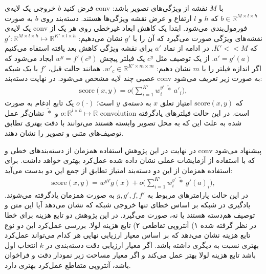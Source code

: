 فرض کنید $b$ خروجی یک لایه‌ی \gls{conv} با $M$ نقشه از ویژگی‌های تصویر باشد: $b \in \mathbb{R}^{M\times l \times h}$ که $h$ و $l$ ارتفاع و عرض نقشه ویژگی‌ها هستند. دسته‌بند روی $b$ به صورت یک لایه‌ی \gls{conv} فورمول‌بندی می‌شود. ابتدا یک کاهش ابعاد غیرخطی روی هر یک از نقشه‌های ویژگی صورت می‌گیرد که آن را با $g'$ نشان می‌دهیم:
$g': \mathbb{R}^{M\times l\times h} \mapsto \mathbb{R}^{K'\times l\times h}$
که
$K' << M$.
در ادامه از نماد  $a'$ برای نقشه ویژگی کاهش بعد یافته استفاه می‌کنیم
$a' = g'(a)$.
از یک توصیف مثل $c^y$ یک  فیلتر پیچش 
 $w^y = f'(c^y)$ ایجاد می‌شود که اگر اندازه فیلتر را با $m$ نشان دهیم: $w'_c \in \mathbb{R}^{K' \times m \times m}$. همانند حالت قبل، $f'$ با یک شبکه عصبی چند لایه مشخص می‌شود. در نهایت دسته‌بند \gls{conv} به صورت زیر تعریف می‌شود:
\begin{align}
\label{eq:conv}
\text{score}(x,y)=o\bigg(\sum_{i=1}^{K'}w^{y'}_{i}\  \check{*} \  a'_i\bigg),
\end{align}
که
 $\text{score}(x,y)$
  امتیاز تعلق $x$ به دسته‌ی $y$ است؛ $o(\cdot)$ یک تابع ادغام به صورت $o:\mathbb{R}^{l\times h} \mapsto \mathbb{R}$  و $\check{*}$ نشان‌گر عمل \gls{convolution} است. در این حالت فیلترهای یادگرفته شده به علت این که به محل تصویر وابسته هستند می‌توانند با دقت بهتری تطابق توصیف‌های متنی و تصویر را نشان دهند.

  در نهایت در این پژوهش استفاده همزمان از دسته‌بندهای خطی و \gls{conv} پیشنهاد می‌شود که با استفاده از آزمایشات عملی نشان داده شده عمل‌کرد بهتری خواهد داشت. برای استفاده همزمان از این دو دسته‌بند امتیاز تطابق از جمع این دو بدست می‌آید:
\begin{align}
\text{score}(x,y)=w^{yT}g(x) + o\bigg(\sum_{i=1}^{K'}w^{y'}_{i}\  \check{*} \  g'(a)_i\bigg),
\end{align}
 در این حالت پارامترهای مربوط به $g, g', f , f'$ به صورت همزمان یادگرفته می‌شوند.
یادگیری در شبکه بر اساس خطای تنها خروجی شبکه که نشان می‌دهد آیا این متن و توصیف هم‌دسته هستند یا نه، صورت می‌گیرد. در این پژوهش دو تابع هزینه برای خطا در نظر گرفته شده ۱) آنتروپی تقاطعی
۲) تابع هزینه لولا. بررسی عمل‌کرد این دو نوع تابع هزینه نشان می‌دهد که بر اساس معیار ارزیابی نهایی هر کدام می‌تواند عمل‌کرد بهتری نسبت به دیگری داشته باشد. اگر معیار ارزیابی دقت دسته‌بندی در $k$ انتخاب اول باشد تابع هزینه لولا بهتر عمل می‌کند و اگر معیار مساحت زیر نمودار دقت و فراخوان باشد، آنتروپی متقاطع عمل‌کرد بهتری دارد.

